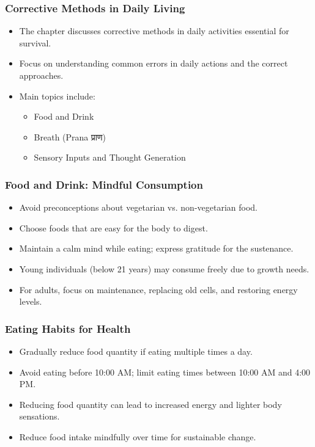 \begin{frame}[fragile]\frametitle{Corrective Methods in Daily Living}
    \begin{itemize}
        \item The chapter discusses corrective methods in daily activities essential for survival.
        \item Focus on understanding common errors in daily actions and the correct approaches.
        \item Main topics include:
        \begin{itemize}
            \item Food and Drink
            \item Breath (Prana प्राण)
            \item Sensory Inputs and Thought Generation
        \end{itemize}
    \end{itemize}
\end{frame}

\begin{frame}[fragile]\frametitle{Food and Drink: Mindful Consumption}
    \begin{itemize}
        \item Avoid preconceptions about vegetarian vs. non-vegetarian food.
        \item Choose foods that are easy for the body to digest.
        \item Maintain a calm mind while eating; express gratitude for the sustenance.
        \item Young individuals (below 21 years) may consume freely due to growth needs.
        \item For adults, focus on maintenance, replacing old cells, and restoring energy levels.
    \end{itemize}
\end{frame}

\begin{frame}[fragile]\frametitle{Eating Habits for Health}
    \begin{itemize}
        \item Gradually reduce food quantity if eating multiple times a day.
        \item Avoid eating before 10:00 AM; limit eating times between 10:00 AM and 4:00 PM.
        \item Reducing food quantity can lead to increased energy and lighter body sensations.
        \item Reduce food intake mindfully over time for sustainable change.
    \end{itemize}
\end{frame}

